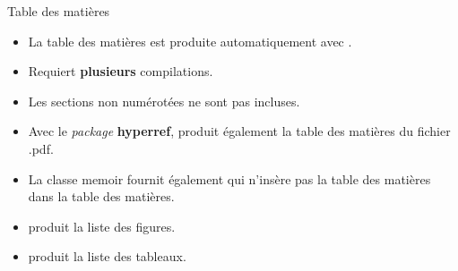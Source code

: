 \begin{frame}[fragile,c]{Table des matières}
	
	\begin{itemize}
		\item La table des matières est produite automatiquement avec .
		\item Requiert \textbf{plusieurs} compilations.
		\item Les sections non numérotées ne sont pas incluses.
		\item Avec le \emph{package} \textbf{hyperref},  produit également la table des matières du fichier .pdf.
		\pause
		\item La classe memoir fournit également  qui n’insère pas la table des matières dans la table des matières.
		\pause
		\item {} produit la liste des figures.
		\item {} produit la liste des tableaux.
	\end{itemize}

\end{frame}

